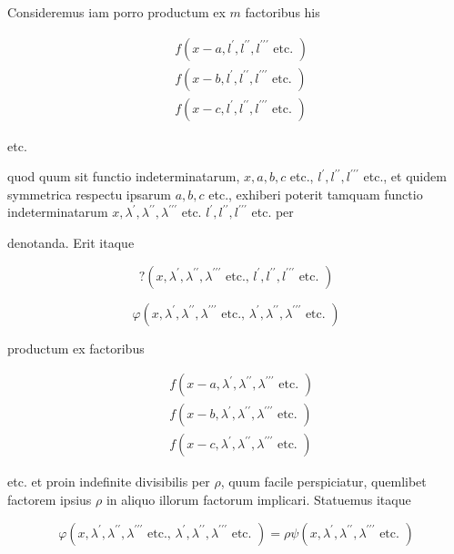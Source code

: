 \documentclass[10pt]{article}
\begin{document}
Consideremus iam porro productum ex \(m\) factoribus his

\[
\begin{aligned}
& f\left(x-a, l^{\prime}, l^{\prime \prime}, l^{\prime \prime \prime} \text { etc. }\right) \\
& f\left(x-b, l^{\prime}, l^{\prime \prime}, l^{\prime \prime \prime} \text { etc. }\right) \\
& f\left(x-c, l^{\prime}, l^{\prime \prime}, l^{\prime \prime \prime} \text { etc. }\right)
\end{aligned}
\]

etc.

quod quum sit functio indeterminatarum, \(x, a, b, c\) etc., \(l^{\prime}, l^{\prime \prime}, l^{\prime \prime \prime}\) etc., et quidem symmetrica respectu ipsarum \(a, b, c\) etc., exhiberi poterit tamquam functio indeterminatarum \(x, \lambda^{\prime}, \lambda^{\prime \prime}, \lambda^{\prime \prime \prime}\) etc. \(l^{\prime}, l^{\prime \prime}, l^{\prime \prime \prime}\) etc. per

denotanda. Erit itaque

\[
?\left(x, \lambda^{\prime}, \lambda^{\prime \prime}, \lambda^{\prime \prime \prime} \text { etc., } l^{\prime}, l^{\prime \prime}, l^{\prime \prime \prime} \text { etc. }\right)
\]

\[
\varphi\left(x, \lambda^{\prime}, \lambda^{\prime \prime}, \lambda^{\prime \prime \prime} \text { etc., } \lambda^{\prime}, \lambda^{\prime \prime}, \lambda^{\prime \prime \prime} \text { etc. }\right)
\]

productum ex factoribus

\[
\begin{aligned}
& f\left(x-a, \lambda^{\prime}, \lambda^{\prime \prime}, \lambda^{\prime \prime \prime} \text { etc. }\right) \\
& f\left(x-b, \lambda^{\prime}, \lambda^{\prime \prime}, \lambda^{\prime \prime \prime} \text { etc. }\right) \\
& f\left(x-c, \lambda^{\prime}, \lambda^{\prime \prime}, \lambda^{\prime \prime \prime} \text { etc. }\right)
\end{aligned}
\]

etc.
et proin indefinite divisibilis per \(\rho\), quum facile perspiciatur, quemlibet factorem ipsius \(\rho\) in aliquo illorum factorum implicari. Statuemus itaque

\[
\varphi\left(x, \lambda^{\prime}, \lambda^{\prime \prime}, \lambda^{\prime \prime \prime} \text { etc., } \lambda^{\prime}, \lambda^{\prime \prime}, \lambda^{\prime \prime \prime} \text { etc. }\right)=\rho \psi\left(x, \lambda^{\prime}, \lambda^{\prime \prime}, \lambda^{\prime \prime \prime} \text { etc. }\right)
\]
\end{document}
